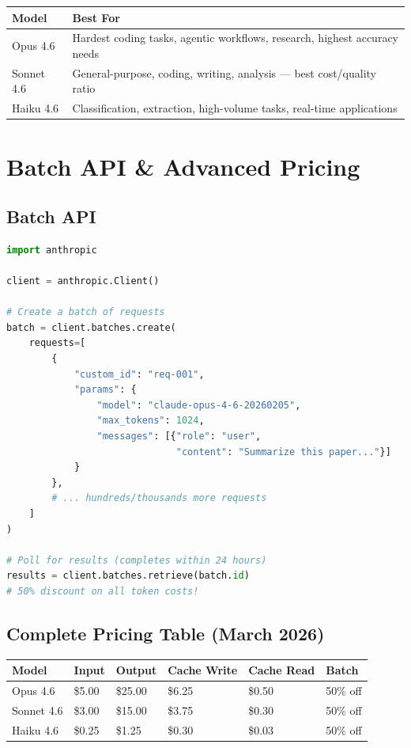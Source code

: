 \documentclass[11pt,a4paper]{article}
\begin{document}
\begin{center}
\begin{tabular}{lL{10cm}}
\toprule
\textbf{Model} & \textbf{Best For} \\
\midrule
Opus 4.6 & Hardest coding tasks, agentic workflows, research, highest accuracy needs \\
Sonnet 4.6 & General-purpose, coding, writing, analysis --- best cost/quality ratio \\
Haiku 4.6 & Classification, extraction, high-volume tasks, real-time applications \\
\bottomrule
\end{tabular}
\end{center}

\section{Batch API \& Advanced Pricing}

\subsection{Batch API}

\begin{lstlisting}[language=Python, caption={Batch API Usage}]
import anthropic

client = anthropic.Client()

# Create a batch of requests
batch = client.batches.create(
    requests=[
        {
            "custom_id": "req-001",
            "params": {
                "model": "claude-opus-4-6-20260205",
                "max_tokens": 1024,
                "messages": [{"role": "user", 
                              "content": "Summarize this paper..."}]
            }
        },
        # ... hundreds/thousands more requests
    ]
)

# Poll for results (completes within 24 hours)
results = client.batches.retrieve(batch.id)
# 50% discount on all token costs!
\end{lstlisting}

\subsection{Complete Pricing Table (March 2026)}

\begin{center}
\begin{tabular}{llllll}
\toprule
\textbf{Model} & \textbf{Input} & \textbf{Output} & \textbf{Cache Write} & \textbf{Cache Read} & \textbf{Batch} \\
\midrule
Opus 4.6 & \$5.00 & \$25.00 & \$6.25 & \$0.50 & 50\% off \\
Sonnet 4.6 & \$3.00 & \$15.00 & \$3.75 & \$0.30 & 50\% off \\
Haiku 4.6 & \$0.25 & \$1.25 & \$0.30 & \$0.03 & 50\% off \\
\bottomrule
\end{tabular}
\end{center}
\end{document}
